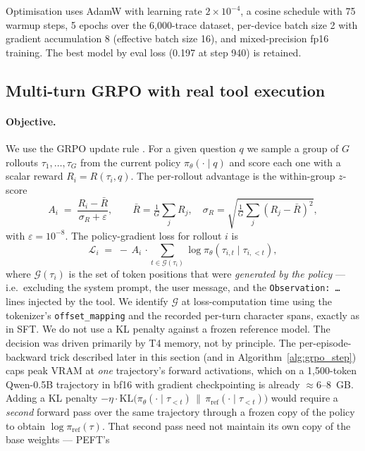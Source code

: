 \documentclass[11pt]{article}
\begin{document}
Optimisation uses AdamW with learning rate $2{\times}10^{-4}$, a
cosine schedule with 75 warmup steps, 5 epochs over the 6,000-trace
dataset, per-device batch size 2 with gradient accumulation 8 (effective
batch size 16), and mixed-precision fp16 training. The best model by
eval loss (0.197 at step 940) is retained.

\subsection{Multi-turn GRPO with real tool execution}
\label{sec:grpo}

\paragraph{Objective.}
We use the GRPO update rule \cite{deepseek-r1}. For a given question
$q$ we sample a group of $G$ rollouts $\tau_1, \ldots, \tau_G$ from the
current policy $\pi_\theta(\cdot \mid q)$ and score each one with a
scalar reward $R_i = R(\tau_i, q)$. The per-rollout advantage is the
within-group $z$-score
\[
  A_i \;=\; \frac{R_i - \bar R}{\sigma_R + \varepsilon},
  \qquad
  \bar R = \tfrac{1}{G}\!\sum_j R_j,
  \quad
  \sigma_R = \sqrt{\tfrac{1}{G}\!\sum_j (R_j - \bar R)^2},
\]
with $\varepsilon = 10^{-8}$. The policy-gradient loss for rollout $i$ is
\[
  \mathcal{L}_i
  \;=\;
  -\,A_i \,\cdot \sum_{t \in \mathcal{G}(\tau_i)} \log \pi_\theta(\tau_{i,t} \mid \tau_{i,<t}),
\]
where $\mathcal{G}(\tau_i)$ is the set of token positions that were
\emph{generated by the policy} --- i.e.\ excluding the system prompt,
the user message, and the \texttt{Observation: \ldots} lines injected
by the tool. We identify $\mathcal{G}$ at loss-computation time using
the tokenizer's \texttt{offset\_mapping} and the recorded per-turn
character spans, exactly as in SFT. We do not use a KL penalty
against a frozen reference model. The decision was driven primarily
by T4 memory, not by principle. The per-episode-backward trick
described later in this section (and in Algorithm~\ref{alg:grpo_step})
caps peak VRAM at \emph{one} trajectory's forward activations,
which on a 1{,}500-token Qwen-0.5B trajectory in bf16 with gradient
checkpointing is already $\approx$6--8~GB. Adding a KL penalty
$-\eta \cdot \mathrm{KL}\big(\pi_\theta(\cdot \mid \tau_{<t}) \,\|\, \pi_\mathrm{ref}(\cdot \mid \tau_{<t})\big)$
would require a \emph{second} forward pass over the same trajectory
through a frozen copy of the policy to obtain
$\log \pi_\mathrm{ref}(\tau)$. That second pass need not maintain
its own copy of the base weights --- PEFT's
\end{document}
